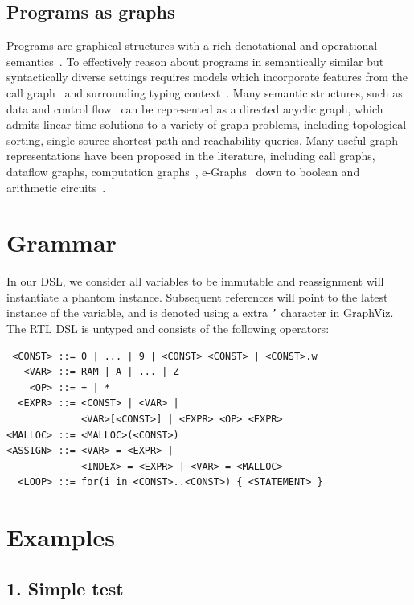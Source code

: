\documentclass[sigplan,10pt,review,anonymous]{acmart}
\begin{document}
\subsection{Programs as graphs}\label{sec:program-graphs}

Programs are graphical structures with a rich denotational and operational semantics~\cite{henkel2018code}. To effectively reason about programs in semantically similar but syntactically diverse settings requires models which incorporate features from the call graph~\cite{liu2019neural} and surrounding typing context~\cite{allamanis2017learning}. Many semantic structures, such as data and control flow~\cite{si2018learning} can be represented as a directed acyclic graph, which admits linear-time solutions to a variety of graph problems, including topological sorting, single-source shortest path and reachability queries. Many useful graph representations have been proposed in the literature, including call graphs, dataflow graphs, computation graphs~\citep{breuleux2017automatic}, e-Graphs~\citep{willsey2020egg} down to boolean and arithmetic circuits~\citep{miller1988efficient}.


\pagebreak\appendix

\section{Grammar}
In our DSL, we consider all variables to be immutable and reassignment will instantiate a phantom instance. Subsequent references will point to the latest instance of the variable, and is denoted using a extra \texttt{'} character in GraphViz. The RTL DSL is untyped and consists of the following operators:

\begin{lstlisting}
 <CONST> ::= 0 | ... | 9 | <CONST> <CONST> | <CONST>.w
   <VAR> ::= RAM | A | ... | Z
    <OP> ::= + | *
  <EXPR> ::= <CONST> | <VAR> |
             <VAR>[<CONST>] | <EXPR> <OP> <EXPR>
<MALLOC> ::= <MALLOC>(<CONST>)
<ASSIGN> ::= <VAR> = <EXPR> |
             <INDEX> = <EXPR> | <VAR> = <MALLOC>
  <LOOP> ::= for(i in <CONST>..<CONST>) { <STATEMENT> }
\end{lstlisting}
\normalsize

\section{Examples}
\subsection*{1. Simple test}
\end{document}

